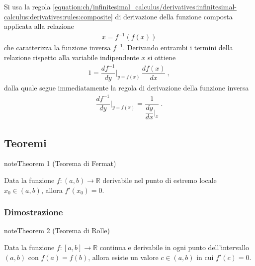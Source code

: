 \documentclass[letterpaper,10pt,english]{jupyterBook}
\begin{document}
\sphinxAtStartPar
Si usa la regola \eqref{equation:ch/infinitesimal_calculus/derivatives:infinitesimal-calculus:derivatives:rules:composite} di derivazione della funzione composta applicata alla relazione
\begin{equation*}
\begin{split}x = f^{-1} \left( f(x) \right)\end{split}
\end{equation*}
\sphinxAtStartPar
che caratterizza la funzione inversa \(f^{-1}\). Derivando entrambi i termini della relazione rispetto alla variabile indipendente \(x\) si ottiene
\begin{equation*}
\begin{split}1 = \dfrac{d f^{-1}}{d y}\bigg|_{y = f(x)} \, \dfrac{d f(x)}{d x} \ ,\end{split}
\end{equation*}
\sphinxAtStartPar
dalla quale segue immediatamente la regola di derivazione della funzione inversa
\begin{equation*}
\begin{split} \dfrac{d f^{-1}}{d y}\bigg|_{y = f(x)} = \dfrac{1}{ \dfrac{d y}{d x}\bigg|_{x}} \ .\end{split}
\end{equation*}

\subsection{Teoremi}
\label{\detokenize{ch/infinitesimal_calculus/derivatives:teoremi}}\label{\detokenize{ch/infinitesimal_calculus/derivatives:infinitesimal-calculus-derivatives-thm}}\label{ch/infinitesimal_calculus/derivatives:theorem-0}
\begin{sphinxadmonition}{note}{Theorem 1 (Teorema di Fermat)}



\sphinxAtStartPar
Data la funzione \(f: (a,b) \rightarrow \mathbb{R}\) derivabile nel punto di estremo locale \(x_0 \in (a,b)\), allora \(f'(x_0) = 0\).
\end{sphinxadmonition}
\subsubsection*{Dimostrazione}

\sphinxAtStartPar
{}


\label{ch/infinitesimal_calculus/derivatives:theorem-1}
\begin{sphinxadmonition}{note}{Theorem 2 (Teorema di Rolle)}



\sphinxAtStartPar
Data la funzione \(f: [a,b] \rightarrow \mathbb{R}\) continua e derivabile in ogni punto dell’intervallo \((a,b)\) con \(f(a) = f(b)\), allora esiste un valore \(c \in (a,b)\) in cui \(f'(c) = 0\).
\end{sphinxadmonition}
\end{document}
